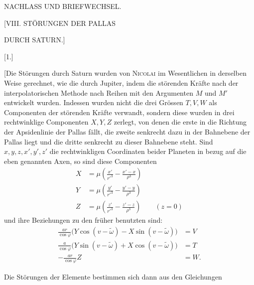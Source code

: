 \clearpage
\begingroup
{}
\renewcommand{\headrulewidth}{0pt}
\clearpage
{}
\begin{center}
\large NACHLASS UND BRIEFWECHSEL.
\par\bigskip
\Large [VIII. STÖRUNGEN DER PALLAS\par DURCH SATURN.]
\par\bigskip
\normalsize [1.]
\end{center}
\begingroup
\small
\makeatletter\tagsleft@true\let\veqno\@@leqno\makeatother
\par\noindent\hspace*{\parindent}[Die Störungen durch Saturn wurden von \textsc{Nicolai} im Wesentlichen in derselben Weise
gerechnet, wie die durch Jupiter, indem die störenden Kräfte nach der interpolatorischen
Methode nach Reihen mit den Argumenten \(M\) und \(M'\) entwickelt wurden. Indessen wurden nicht
die drei Grössen \(T,V,W\) als Componenten der störenden Kräfte verwandt, sondern diese
wurden in drei rechtwinklige Componenten \(X,Y,Z\) zerlegt, von denen die erste in die
Richtung der Apsidenlinie der Pallas fällt, die zweite senkrecht dazu in der Bahnebene der
Pallas liegt und die dritte senkrecht zu dieser Bahnebene steht. Sind \(x,y,z,x',y',z'\)
die rechtwinkligen Coordinaten beider Planeten in bezug auf die eben genannten Axen, so sind
diese Componenten
\[
\tag*{1)}
\begin{aligned}
X&=\mu\left(\frac{x'}{r'^3}-\frac{x'-x}{\rho^3}\right)\\[.6em]
Y&=\mu\left(\frac{y'}{r'^3}-\frac{y'-y}{\rho^3}\right)\\[.6em]
Z&=\mu\left(\frac{z'}{r'^3}-\frac{z'-z}{\rho^3}\right)\qquad(z=0)
\end{aligned}
\]
und ihre Beziehungen zu den früher benutzten sind:
\[
\begin{aligned}
\frac{ar}{\cos\varphi}\bigl(Y\cos(v-\tilde\omega)-X\sin(v-\tilde\omega)\bigr)&=V\\[.6em]
\frac{a}{\cos\varphi}\bigl(Y\sin(v-\tilde\omega)+X\cos(v-\tilde\omega)\bigr)&=T\\[.6em]
-\frac{ar}{\cos\varphi}Z&=W.
\end{aligned}
\]
\par\noindent\hspace*{\parindent}Die Störungen der Elemente bestimmen sich dann aus den Gleichungen
